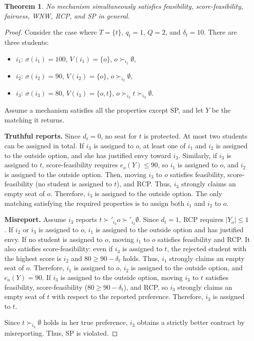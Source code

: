 \documentclass[a4paper,twoside]{article}
\newtheorem{theorem}{Theorem}
\theoremstyle{definition}
\begin{document}
\begin{theorem}
\label{thm:imp2}
No mechanism simultaneously satisfies feasibility, score-feasibility, fairness, WNW,
RCP, and SP in general.
\end{theorem}
\begin{proof}
Consider the case where $T=\{t\}$, $q_t=1$, $Q=2$, and $\delta_t=10$.
There are three students:
\begin{itemize}
\item $i_1$: $\sigma(i_1)=100$, $V(i_1)=\{o\}$, $o\succ_{i_1}\emptyset$,
\item $i_2$: $\sigma(i_2)=90$, $V(i_2)=\{o\}$, $o\succ_{i_2}\emptyset$,
\item $i_3$: $\sigma(i_3)=80$, $V(i_3)=\{o,t\}$,
$o\succ_{i_3}t\succ_{i_3}\emptyset$.
\end{itemize}
Assume a mechanism satisfies all the properties except SP, and let $Y$
be the matching it returns.

\textbf{Truthful reports.}
Since $d_t=0$, no seat for $t$ is protected. 
At most two students can be assigned in total. 
If $i_3$ is assigned to $o$, 
at least one of $i_1$ and $i_2$ is assigned to the outside option,
and she has justified envy toward $i_3$.
Similarly, if $i_3$ is assigned to $t$, 
score-feasibility requires $e_o(Y)\le 90$, so $i_1$ is
assigned to $o$, and $i_2$ is assigned to the outside option.
Then, moving $i_3$ to $o$ satisfies feasibility, score-feasibility (no student is
assigned to $t$), and RCP.
Thus, $i_3$ strongly claims an empty seat of $o$.
Therefore, $i_3$ is assigned to the outside option.
The only matching satisfying the required properties is to 
assign both $i_1$ and $i_2$ to $o$. 

\textbf{Misreport.}
Assume $i_3$ reports $t\succ'_{i_3}o\succ'_{i_3}\emptyset$.
Since $d_t=1$, RCP requires $|Y_o|\le 1$.
If $i_2$ or $i_3$ is assigned to $o$, $i_1$ is assigned to the outside option and has
justified envy.
If no student is assigned to $o$, moving $i_1$ to $o$ satisfies feasibility and RCP.
It also satisfies score-feasibility: even if $i_3$ is assigned to
$t$, the rejected student with the highest score is $i_2$ and $80\ge 90-\delta_t$ holds.
Thus, $i_1$ strongly claims an empty seat of $o$.
Therefore, $i_1$ is assigned to $o$, $i_2$ is assigned to the outside option, and
$e_o(Y)=90$.
If $i_3$ is assigned to the outside option, moving $i_3$ to $t$ satisfies feasibility,
score-feasibility ($80\ge 90-\delta_t$), and RCP, so $i_3$
strongly claims an empty seat of $t$ with respect to the reported preference.
Therefore, $i_3$ is assigned to $t$.

Since $t\succ_{i_3}\emptyset$ holds in her true preference, $i_3$ obtains a strictly
better contract by misreporting. Thus, SP is violated.
\end{proof}
\end{document}

